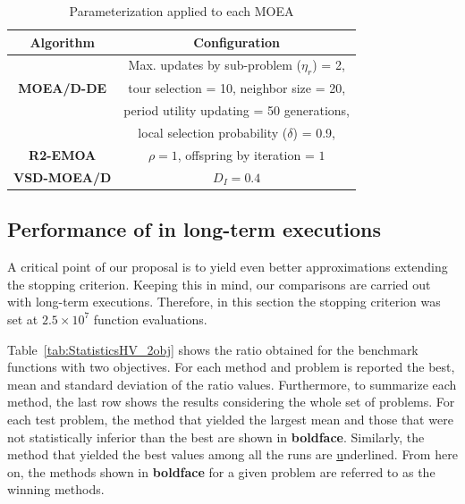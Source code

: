 \begin{table}[t]
\centering
\caption{ Parameterization applied to each MOEA}
\label{tab:Parametrization}
\begin{tabular}{c|c}
\hline
\textbf{Algorithm} & \textbf{Configuration} \\ \hline
\multirow{3}{*}{
\textbf{MOEA/D-DE}} & Max. updates by sub-problem ($\eta_r$) = 2, \\
 & tour selection = 10,   neighbor size = 20, \\
 & period utility updating = 50 generations, \\
 & local selection probability ($\delta$) = 0.9,\\ \hline
\textbf{R2-EMOA} & $\rho=1$, offspring by iteration = $1$ \\ \hline
\textbf{VSD-MOEA/D} & $D_I=0.4$ \\ \hline
\end{tabular}
\end{table}



\subsection{Performance of \MOEAS{} in long-term executions}


A critical point of our proposal is to yield even better approximations extending the stopping criterion.
%
Keeping this in mind, our comparisons are carried out with long-term executions.
%
Therefore, in this section the stopping criterion was set at $2.5 \times 10^7$ function evaluations.
%

%
Table~\ref{tab:StatisticsHV_2obj} shows the \HV{} ratio obtained for the benchmark functions with two objectives.
%
For each method and problem is reported the best, mean and standard deviation of the \HV{} ratio values.
%
Furthermore, to summarize each method, the last row shows the results considering the whole set of problems.
%
For each test problem, the method that yielded the largest mean and those that were not statistically inferior than the best are shown in \textbf{boldface}.
%
%
Similarly, the method that yielded the best \HV{} values among all the runs are {\ul underlined}.
%
From here on, the methods shown in {\bf boldface} for a given problem are referred to as the winning methods.
%

